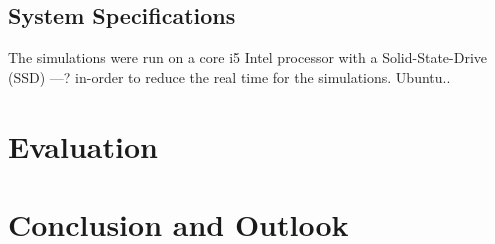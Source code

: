\documentclass{listhesis}
\begin{document}
\section{System Specifications}
The simulations were run on a core i5 Intel processor with a Solid-State-Drive (SSD) ---? in-order to reduce the real time for the simulations. Ubuntu..
\chapter{Evaluation}

\chapter{Conclusion and Outlook}


\cleardoublepage



\confirmation
\end{document}
